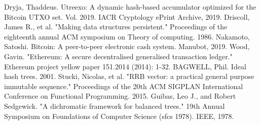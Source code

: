 \documentclass[conference]{IEEEtran}
\begin{document}
\begin{thebibliography}{00}
 Dryja, Thaddeus. Utreexo: A dynamic hash-based accumulator optimized for the Bitcoin UTXO set. Vol. 2019. IACR Cryptology ePrint Archive, 2019.
 Driscoll, James R., et al. "Making data structures persistent." Proceedings of the eighteenth annual ACM symposium on Theory of computing. 1986.
 Nakamoto, Satoshi. Bitcoin: A peer-to-peer electronic cash system. Manubot, 2019.
 Wood, Gavin. "Ethereum: A secure decentralised generalised transaction ledger." Ethereum project yellow paper 151.2014 (2014): 1-32.
 BAGWELL, Phil. Ideal hash trees. 2001.
 Stucki, Nicolas, et al. "RRB vector: a practical general purpose immutable sequence." Proceedings of the 20th ACM SIGPLAN International Conference on Functional Programming. 2015.
 Guibas, Leo J., and Robert Sedgewick. "A dichromatic framework for balanced trees." 19th Annual Symposium on Foundations of Computer Science (sfcs 1978). IEEE, 1978.
\end{thebibliography}
\vspace{12pt}
\end{document}
